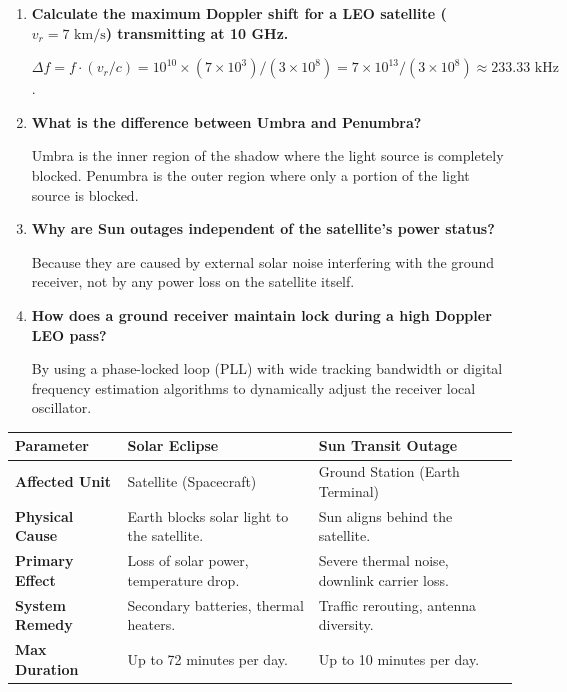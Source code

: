 \documentclass[12pt,a4paper]{article}
\newcommand{\Q}[1]{\textbf{#1}\par\noindent\ignorespaces}
\renewcommand{\arraystretch}{1.45}
\begin{document}
\begin{tcolorbox}[exambox, title={\textbf{Frequently Asked / Viva Questions}}]
\begin{enumerate}[topsep=0pt, label=\textbf{Q\arabic*.}, itemsep=5pt]
  \item \Q{Calculate the maximum Doppler shift for a LEO satellite ($v_r = 7 \text{ km/s}$) transmitting at 10 GHz.}
    $\Delta f = f \cdot (v_r/c) = 10^{10} \times (7 \times 10^3) / (3 \times 10^8) = 7 \times 10^{13} / (3 \times 10^8) \approx 233.33 \text{ kHz}$.
  \item \Q{What is the difference between Umbra and Penumbra?}
    Umbra is the inner region of the shadow where the light source is completely blocked. Penumbra is the outer region where only a portion of the light source is blocked.
  \item \Q{Why are Sun outages independent of the satellite's power status?}
    Because they are caused by external solar noise interfering with the ground receiver, not by any power loss on the satellite itself.
  \item \Q{How does a ground receiver maintain lock during a high Doppler LEO pass?}
    By using a phase-locked loop (PLL) with wide tracking bandwidth or digital frequency estimation algorithms to dynamically adjust the receiver local oscillator.
\end{enumerate}
\end{tcolorbox}

\begin{tcolorbox}[tikzbox, title={Comparison of Solar Eclipse and Sun Transit Outage}]
\renewcommand{\arraystretch}{1.4}
\par\noindent
{\renewcommand{\arraystretch}{1.55}%
\begin{tabularx}{\linewidth}{|B{3.2cm}|Y|Y|}\hline
\textbf{Parameter} & \textbf{\color{myteal}Solar Eclipse} & \textbf{\color{myamber}Sun Transit Outage} \\[4pt]
\hline
\textbf{Affected Unit} & Satellite (Spacecraft) & Ground Station (Earth Terminal) \\
\hline
\textbf{Physical Cause} & Earth blocks solar light to the satellite. & Sun aligns behind the satellite. \\[4pt]
\hline
\textbf{Primary Effect} & Loss of solar power, temperature drop. & Severe thermal noise, downlink carrier loss. \\[4pt]
\hline
\textbf{System Remedy} & Secondary batteries, thermal heaters. & Traffic rerouting, antenna diversity. \\[4pt]
\hline
\textbf{Max Duration} & Up to 72 minutes per day. & Up to 10 minutes per day. \\
\hline
\end{tabularx}
}
\end{tcolorbox}
\end{document}

